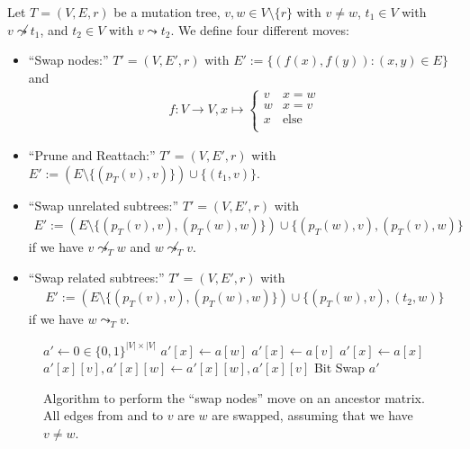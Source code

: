 \begin{definition}
    \label{def:tree_moves}
    Let $T = (V, E, r)$ be a mutation tree, $v, w \in V \setminus \{r\}$ with $v \neq w$, $t_1 \in V$ with $v \not\leadsto t_1$, and $t_2 \in V$ with $v \leadsto t_2$. We define four different moves:
    \begin{itemize}
        \item ``Swap nodes:'' $T' = (V, E', r)$ with $E' := \{(f(x), f(y)) : (x, y) \in E\}$ and
        \begin{align*}
            f: V \rightarrow V, x \mapsto \begin{cases}
                v & x = w \\
                w & x = v \\
                x & \text{else} \\
            \end{cases}
        \end{align*}
        \item ``Prune and Reattach:'' $T' = (V, E', r)$ with $E' := (E \setminus \{(p_T(v), v)\}) \cup \{(t_1, v)\}$.
        \item ``Swap unrelated subtrees:'' $T' = (V, E', r)$ with
        \begin{align*}
            E' := (E \setminus \{(p_T(v), v), (p_T(w), w)\}) \cup \{(p_T(w), v), (p_T(v), w)\}
        \end{align*}
        if we have $v \not\leadsto_T w$ and $w \not \leadsto_T v$.
        \item ``Swap related subtrees:'' $T' = (V, E', r)$ with 
        \begin{align*}
            E' := (E \setminus \{(p_T(v), v), (p_T(w), w)\}) \cup \{(p_T(w), v), (t_2, w)\}
        \end{align*}
        if we have $w \leadsto_T v$.
    \end{itemize}
\end{definition}

\begin{figure}[p]
    \begin{algorithmic}[1]
            \State $a' \leftarrow 0 \in \{0,1\}^{|V| \times |V|}$
                    \State $a'[x] \leftarrow a[w]$
                    \State $a'[x] \leftarrow a[v]$
                \Else
                    \State $a'[x] \leftarrow a[x]$
                \EndIf
                \State $a'[x][v], a'[x][w] \leftarrow a'[x][w], a'[x][v]$ \Comment Bit Swap
            \EndFor
            \State \Return $a'$
        \EndFunction
    \end{algorithmic}
    \caption{Algorithm to perform the ``swap nodes'' move on an ancestor matrix. All edges from and to $v$ are $w$ are swapped, assuming that we have $v \neq w$.}
    \label{alg:am_swap_nodes}
\end{figure}

